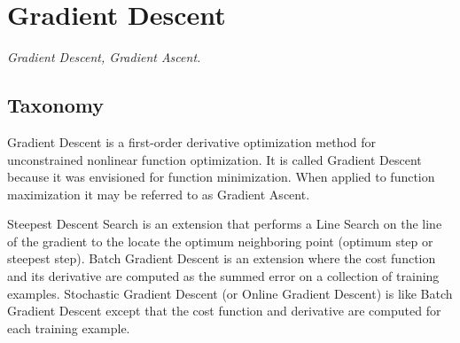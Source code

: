 

\section{Gradient Descent} 
\label{sec:gradient_descent}

\emph{Gradient Descent, Gradient Ascent.}

\subsection{Taxonomy}
Gradient Descent is a first-order derivative optimization method for unconstrained nonlinear function optimization. It is called Gradient Descent because it was envisioned for function minimization. When applied to function maximization it may be referred to as Gradient Ascent. 

Steepest Descent Search is an extension that performs a Line Search on the line of the gradient to the locate the optimum neighboring point (optimum step or steepest step).
Batch Gradient Descent is an extension where the cost function and its derivative are computed as the summed error on a collection of training examples.
Stochastic Gradient Descent (or Online Gradient Descent) is like Batch Gradient Descent except that the cost function and derivative are computed for each training example.

